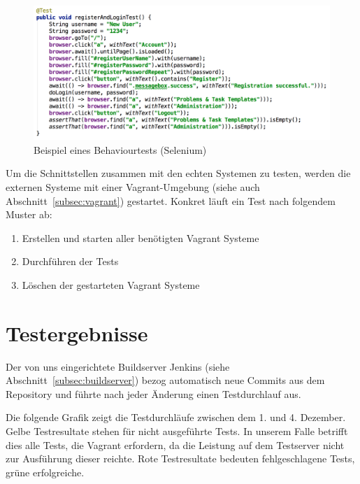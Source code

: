 \begin{description}
					\begin{figure}[H]
						\includegraphics[scale=0.65]{projectPlan/media/img/behaviourTest.png}
						\centering
						\caption{Beispiel eines Behaviourtests (Selenium)}
						\label{fig:exampleBehaviourtest}
					\end{figure}

					Um die Schnittstellen zusammen mit den echten Systemen zu testen,
					werden die externen Systeme mit einer Vagrant-Umgebung (siehe auch Abschnitt~\ref{subsec:vagrant}) gestartet.
					Konkret läuft ein Test nach folgendem Muster ab:
					\begin{enumerate}
						\item Erstellen und starten aller benötigten Vagrant Systeme
						\item Durchführen der Tests
						\item Löschen der gestarteten Vagrant Systeme
					\end{enumerate}


			\end{description}
		
		\section{Testergebnisse}
			Der von uns eingerichtete Buildserver Jenkins (siehe Abschnitt~\ref{subsec:buildserver}) bezog automatisch neue Commits aus dem Repository und führte nach jeder Änderung einen Testdurchlauf aus.
			
			Die folgende Grafik zeigt die Testdurchläufe zwischen dem 1. und 4. Dezember.
			Gelbe Testresultate stehen für nicht ausgeführte Tests.
			In unserem Falle betrifft dies alle Tests, die Vagrant erfordern, da die Leistung auf dem Testserver nicht zur Ausführung dieser reichte.
			Rote Testresultate bedeuten fehlgeschlagene Tests, grüne erfolgreiche.

